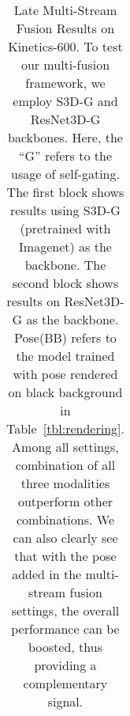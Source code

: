 \documentclass[letterpaper]{article} \usepackage{aaai21}  \usepackage{times}  \usepackage{helvet} \usepackage{courier}  \usepackage[hyphens]{url}  \usepackage{graphicx} \urlstyle{rm} \def\UrlFont{\rm}  \usepackage{natbib}  \usepackage{caption} \frenchspacing  \setlength{\pdfpagewidth}{8.5in}  \setlength{\pdfpageheight}{11in}
\begin{document}
\begin{table}[t!]
{\begin{tabular}{c | l | c | c | c }
\bottomrule [0.2em]
\end{tabular}
}
\centering
\caption{\footnotesize Late Multi-Stream Fusion Results on Kinetics-600. To test our 
multi-fusion framework, we employ S3D-G and ResNet3D-G backbones.  Here, the ``G'' refers to the usage of self-gating. 
The first block shows results using S3D-G (pretrained with Imagenet) as the backbone. The second block shows results on ResNet3D-G as the backbone. Pose(BB) refers to the model trained with pose rendered on black background in Table~\ref{tbl:rendering}. Among all settings, combination of all three modalities outperform other combinations. We can also clearly see that with the pose added in the multi-stream fusion settings, the overall performance can be boosted, thus providing a complementary signal.}
\label{tab:main_results}
\vspace{-0.4cm}
\end{table}

\begin{table*}[t!]
\setlength{\extrarowheight}{1pt}
\centering
\caption{\footnotesize Comparison with the state-of-the-art on Kinetics-600.}
\label{tbl:k600_compare}
\vspace{-0.4cm}
\end{table*}
\end{document}
